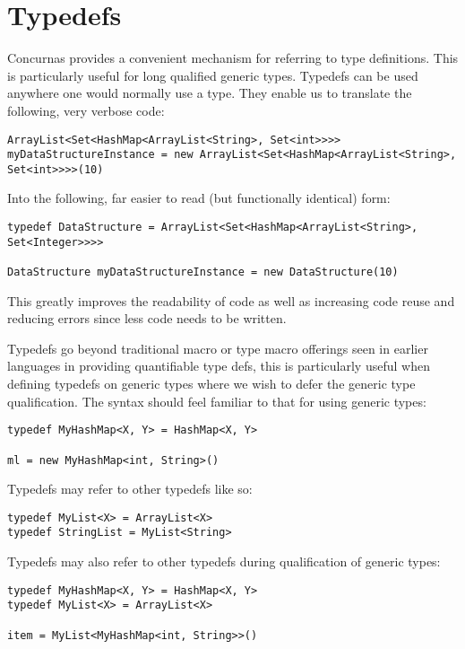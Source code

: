 \documentclass[conc-doc]{subfiles}
\begin{document}
	
	\chapter[Typedefs]{Typedefs}
	\label{chap:typedefs}
	
Concurnas provides a convenient mechanism for referring to type definitions. This is particularly useful for long qualified generic types. Typedefs can be used anywhere one would normally use a type. They enable us to translate the following, very verbose code:
\begin{lstlisting}
ArrayList<Set<HashMap<ArrayList<String>, Set<int>>>> myDataStructureInstance = new ArrayList<Set<HashMap<ArrayList<String>, Set<int>>>>(10)
\end{lstlisting}
Into the following, far easier to read (but functionally identical) form:
\begin{lstlisting}
typedef DataStructure = ArrayList<Set<HashMap<ArrayList<String>, Set<Integer>>>>

DataStructure myDataStructureInstance = new DataStructure(10)
\end{lstlisting}

This greatly improves the readability of code as well as increasing code reuse and reducing errors since less code needs to be written.

Typedefs go beyond traditional macro or type macro offerings seen in earlier languages in providing quantifiable type defs, this is particularly useful when defining typedefs on generic types where we wish to defer the generic type qualification. The syntax should feel familiar to that for using generic types: 
\begin{lstlisting}
typedef MyHashMap<X, Y> = HashMap<X, Y>

ml = new MyHashMap<int, String>()
\end{lstlisting}

Typedefs may refer to other typedefs like so:
\begin{lstlisting}
typedef MyList<X> = ArrayList<X>
typedef StringList = MyList<String>
\end{lstlisting}

Typedefs may also refer to other typedefs during qualification of generic types:
\begin{lstlisting}
typedef MyHashMap<X, Y> = HashMap<X, Y>
typedef MyList<X> = ArrayList<X>

item = MyList<MyHashMap<int, String>>()
\end{lstlisting}
\end{document}
